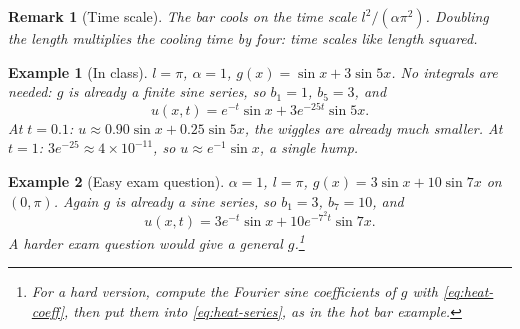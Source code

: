\documentclass{article}
\newtheorem*{example}{Example}
\newtheorem{remark}{Remark}
\begin{document}
\begin{remark}[Time scale]
    The bar cools on the time scale $l^2/(\alpha\pi^2)$. Doubling the length multiplies the cooling time by four: time scales like length squared.
\end{remark}
\begin{example}[In class]
    $l = \pi$, $\alpha = 1$, $g(x) = \sin x + 3\sin 5x$. No integrals are needed: $g$ is already a finite sine series, so $b_1 = 1$, $b_5 = 3$, and
    \begin{equation}
        u(x,t) = e^{-t}\sin x + 3e^{-25t}\sin 5x.
    \end{equation}
    At $t = 0.1$: $u \approx 0.90\sin x + 0.25\sin 5x$, the wiggles are already much smaller. At $t = 1$: $3e^{-25} \approx 4\times10^{-11}$, so $u \approx e^{-1}\sin x$, a single hump.
\end{example}
\begin{example}[Easy exam question]
    $\alpha = 1$, $l = \pi$, $g(x) = 3\sin x + 10\sin 7x$ on $(0,\pi)$. Again $g$ is already a sine series, so $b_1 = 3$, $b_7 = 10$, and
    \begin{equation}
        u(x,t) = 3e^{-t}\sin x + 10e^{-7^2t}\sin 7x.
    \end{equation}
    A harder exam question would give a general $g$.\footnote{For a hard version, compute the Fourier sine coefficients of $g$ with \eqref{eq:heat-coeff}, then put them into \eqref{eq:heat-series}, as in the hot bar example.}
\end{example}
\end{document}
